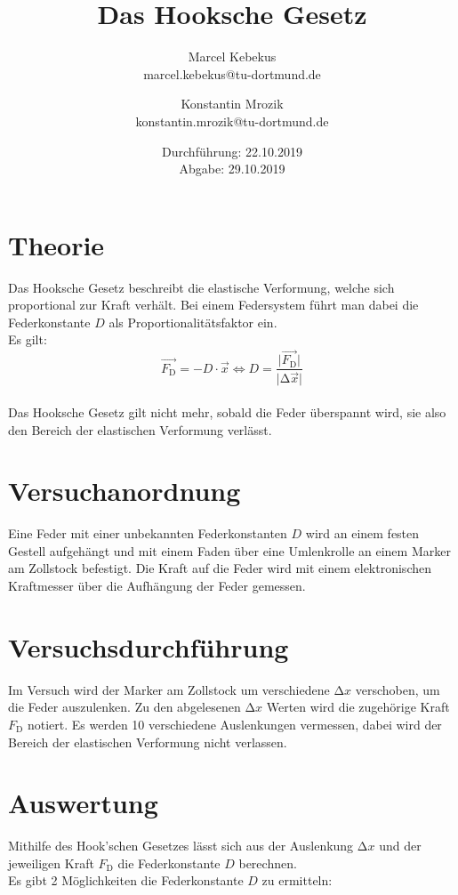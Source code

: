\documentclass[titlepage = firstcover]{scrartcl}
\title{Das Hooksche Gesetz}
\author{Marcel Kebekus\\marcel.kebekus@tu-dortmund.de \and Konstantin Mrozik \\ konstantin.mrozik@tu-dortmund.de}
\date{%
  Durchführung: 22.10.2019 \\
  Abgabe: 29.10.2019
  }
\begin{document}
\maketitle
\thispagestyle{empty}
\tableofcontents
\clearpage
\setcounter{page}{1}

\newpage

\section{Theorie}
\label{sec:Theorie}
Das Hooksche Gesetz beschreibt die elastische Verformung, welche sich
proportional zur Kraft verhält.
Bei einem Federsystem führt man dabei die Federkonstante $D$ als Proportionalitätsfaktor ein.\\
Es gilt:
\\
\begin{equation}
  \vec{F_{\text{D}}}=-D \cdot \vec{x} \iff D=\frac{\lvert\vec{F_{\text{D}}}\rvert}{\lvert\increment\vec{x}\rvert}
  \label{eqn:Formel}
\end{equation}
\\
Das Hooksche Gesetz gilt nicht mehr, sobald die Feder überspannt wird, sie also den Bereich der
elastischen Verformung verlässt.


\section{Versuchanordnung}
\label{sec:Versuchsanordnung}
Eine Feder mit einer unbekannten Federkonstanten $D$ wird an einem festen Gestell aufgehängt
und mit einem Faden über eine Umlenkrolle an einem Marker am Zollstock befestigt. 
Die Kraft auf die Feder wird mit einem elektronischen Kraftmesser über die Aufhängung der Feder gemessen.


\section{Versuchsdurchführung}
\label{sec:Versuchsdurchführung}
Im Versuch wird der Marker am Zollstock um verschiedene $\increment x$ verschoben, um die Feder
auszulenken.
Zu den abgelesenen $\increment x$ Werten wird die zugehörige Kraft $F_{\text{D}}$ notiert.
Es werden 10 verschiedene Auslenkungen vermessen, dabei wird der Bereich der elastischen Verformung nicht verlassen.

\newpage

\section{Auswertung}
\label{sec:Auswertung}
Mithilfe des Hook'schen Gesetzes lässt sich aus der Auslenkung $\increment x$ und der jeweiligen
Kraft $F_{\text{D}}$ die Federkonstante $D$ berechnen.\\
Es gibt 2 Möglichkeiten die Federkonstante $D$ zu ermitteln:
\end{document}
